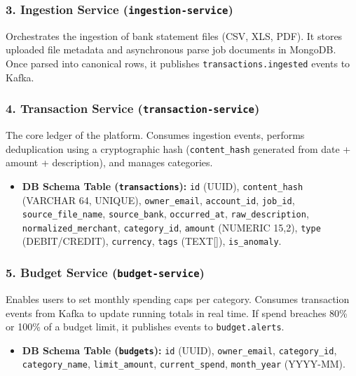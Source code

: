 \documentclass[12pt,a4paper]{report}
\begin{document}
\subsubsection{3. Ingestion Service (\texttt{ingestion-service})}
Orchestrates the ingestion of bank statement files (CSV, XLS, PDF). It stores uploaded file metadata and asynchronous parse job documents in MongoDB. Once parsed into canonical rows, it publishes \texttt{transactions.ingested} events to Kafka.

\subsubsection{4. Transaction Service (\texttt{transaction-service})}
The core ledger of the platform. Consumes ingestion events, performs deduplication using a cryptographic hash (\texttt{content\_hash} generated from date + amount + description), and manages categories.
\begin{itemize}[leftmargin=1.5em, noitemsep]
  \item \textbf{DB Schema Table (\texttt{transactions}):} \texttt{id} (UUID), \texttt{content\_hash} (VARCHAR 64, UNIQUE), \texttt{owner\_email}, \texttt{account\_id}, \texttt{job\_id}, \texttt{source\_file\_name}, \texttt{source\_bank}, \texttt{occurred\_at}, \texttt{raw\_description}, \texttt{normalized\_merchant}, \texttt{category\_id}, \texttt{amount} (NUMERIC 15,2), \texttt{type} (DEBIT/CREDIT), \texttt{currency}, \texttt{tags} (TEXT[]), \texttt{is\_anomaly}.
\end{itemize}

\subsubsection{5. Budget Service (\texttt{budget-service})}
Enables users to set monthly spending caps per category. Consumes transaction events from Kafka to update running totals in real time. If spend breaches 80\% or 100\% of a budget limit, it publishes events to \texttt{budget.alerts}.
\begin{itemize}[leftmargin=1.5em, noitemsep]
  \item \textbf{DB Schema Table (\texttt{budgets}):} \texttt{id} (UUID), \texttt{owner\_email}, \texttt{category\_id}, \texttt{category\_name}, \texttt{limit\_amount}, \texttt{current\_spend}, \texttt{month\_year} (YYYY-MM).
\end{itemize}
\end{document}

